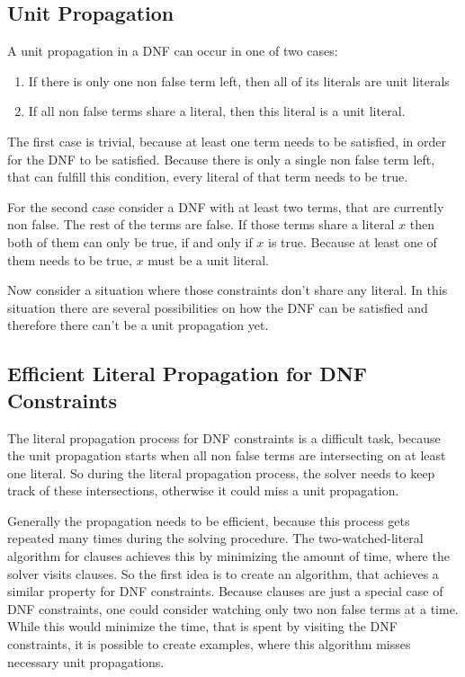 \subsection{Unit Propagation}
A unit propagation in a DNF can occur in one of two cases:
\begin{leftbar}
\begin{enumerate}
\item If there is only one non false term left, then all of its literals are unit literals
\item If all non false terms share a literal, then this literal is a unit literal.
\end{enumerate}
\end{leftbar}
The first case is trivial, because at least one term needs to be satisfied, in order for the DNF to be satisfied. Because there is only a single non false term left, that can fulfill this condition, every literal of that term needs to be true.
\par
For the second case consider a DNF with at least two terms, that are currently non false. The rest of the terms are false. If those terms share a literal $x$ then both of them can only be true, if and only if $x$ is true. Because at least one of them needs to be true, $x$ must be a unit literal.
\par
Now consider a situation where those constraints don't share any literal. In this situation there are several possibilities on how the DNF can be satisfied and therefore there can't  be a unit propagation yet.

\subsection{Efficient Literal Propagation for DNF Constraints}

The literal propagation process for DNF constraints is a difficult task, because the unit propagation starts when all non false terms are intersecting on at least one literal. So during the literal propagation process, the solver needs to keep track of these intersections, otherwise it could miss a unit propagation. 

Generally the propagation needs to be efficient, because this process gets repeated many times during the solving procedure. The two-watched-literal algorithm for clauses achieves this by minimizing the amount of time, where the solver visits clauses. So the first idea is to create an algorithm, that achieves a similar property for DNF constraints. Because clauses are just a special case of DNF constraints, one could consider watching only two non false terms at a time. While this would minimize the time, that is spent by visiting the DNF constraints, it is possible to create examples, where this algorithm misses necessary unit propagations.

